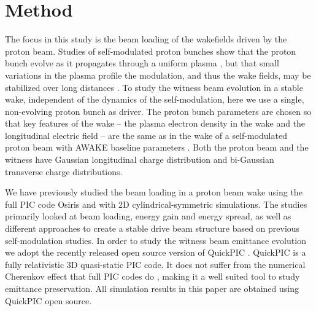 \documentclass[aps,prstab,reprint,amsmath,amssymb,groupedaddress]{revtex4-1}
\begin{document}


\section[\label{S:M}]{Method}

The focus in this study is the beam loading of the wakefields driven by the proton beam. Studies of self-modulated
proton bunches show that the proton bunch evolve as it propagates through a uniform plasma \cite{lotov:2011}, but that
small variations in the plasma profile the modulation, and thus the wake fields, may be stabilized over long distances
\cite{lotov:2011, lotov:2015, caldwell:2011}.  To study the witness beam evolution in a stable wake, independent of the
dynamics of the self-modulation, %
here we use a single, non-evolving proton bunch as driver. The proton bunch parameters are chosen so that key features of
the wake -- the plasma electron density in the wake and the longitudinal electric field -- are the same as %
in the wake of a self-modulated proton beam with AWAKE baseline parameters \cite{gschwendtner:2016}. Both the proton
beam and the witness have Gaussian %
longitudinal charge distribution and bi-Gaussian transverse charge distributions.

We have previously studied the beam loading in a proton beam wake using the full PIC code Osiris \cite{fonseca:2002}
and with 2D cylindrical-symmetric simulations. The studies \cite{berglyd_olsen:2015, berglyd_olsen:2016} primarily
looked at beam loading, energy gain and energy spread, as well as different approaches to create a stable drive beam
structure based on previous self-modulation studies. In order to study the witness beam emittance evolution we adopt the
recently released open source version of QuickPIC \cite{huang:2006, an:2013}. QuickPIC is a fully relativistic 3D
quasi-static PIC code. It does not suffer from the numerical Cherenkov effect that full PIC codes do
\cite{godfrey:1974,lehe:2013}, making it a well suited tool to study emittance preservation.  All simulation results in
this paper are %
obtained using QuickPIC open source.  
\end{document}
